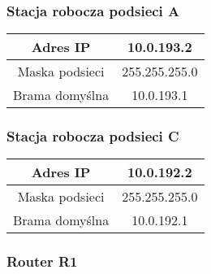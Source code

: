 \documentclass[wide,a4paper,titlepage,12pt] {article}
\begin{document}
  \subsubsection{Stacja robocza podsieci A}
  \begin{center}
    \begin{tabular}{|c|c|}
      \hline
      Adres IP & 10.0.193.2 \\
      \hline
      Maska podsieci & 255.255.255.0 \\
      \hline
      Brama domyślna & 10.0.193.1 \\
      \hline
    \end{tabular}
  \end{center}


  \subsubsection{Stacja robocza podsieci C}
  \begin{center}
    \begin{tabular}{|c|c|}
      \hline
      Adres IP & 10.0.192.2 \\
      \hline
      Maska podsieci & 255.255.255.0 \\
      \hline
      Brama domyślna & 10.0.192.1 \\
      \hline
    \end{tabular}
  \end{center}

  \subsubsection{Router R1}
\end{document}
